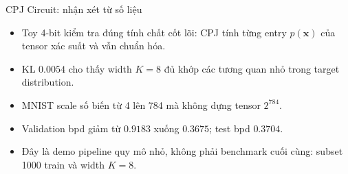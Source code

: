 \begin{frame}{CPJ Circuit: nhận xét từ số liệu}
\begin{itemize}
    \item Toy 4-bit kiểm tra đúng tính chất cốt lõi: CPJ tính từng entry $p(\mathbf{x})$ của tensor xác suất và vẫn chuẩn hóa.
    \item KL $0.0054$ cho thấy width $K=8$ đủ khớp các tương quan nhỏ trong target distribution.
    \item MNIST scale số biến từ 4 lên 784 mà không dựng tensor $2^{784}$.
    \item Validation bpd giảm từ $0.9183$ xuống $0.3675$; test bpd $0.3704$.
    \item Đây là demo pipeline quy mô nhỏ, không phải benchmark cuối cùng: subset 1000 train và width $K=8$.
\end{itemize}
\end{frame}

